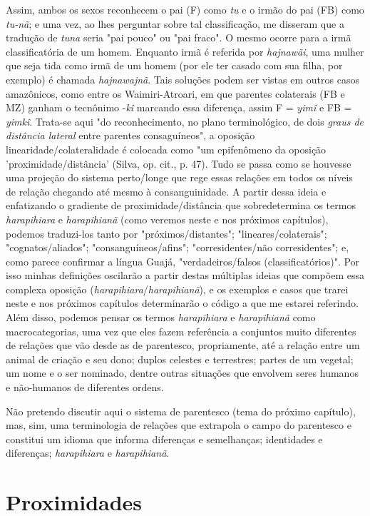 Assim, ambos os sexos reconhecem o pai (F) como \emph{tu} e o irmão do
pai (FB) como \emph{tu-nã}; e uma vez, ao lhes perguntar sobre tal
classificação, me disseram que a tradução de \emph{tuna} seria "pai
pouco" ou "pai fraco". O mesmo ocorre para a irmã classificatória de um
homem. Enquanto irmã é referida por \emph{hajnawãi}, uma mulher que seja
tida como irmã de um homem (por ele ter casado com sua filha, por
exemplo) é chamada \emph{hajnawajnã}. Tais soluções podem ser vistas em
outros casos amazônicos, como entre os Waimiri-Atroari, em que parentes
colaterais (FB e MZ) ganham o tecnônimo -\emph{kî} marcando essa
diferença, assim F = \emph{yimî} e FB = \emph{yimkî}. Trata-se aqui "do
reconhecimento, no plano terminológico, de dois \emph{graus de distância
lateral} entre parentes consaguíneos", a oposição
linearidade/colateralidade é colocada como "um epifenômeno da oposição
'proximidade/distância' (Silva, op. cit., p. 47). Tudo se passa como se
houvesse uma projeção do sistema perto/longe que rege essas relações em
todos os níveis de relação chegando até mesmo à consanguinidade. A
partir dessa ideia e enfatizando o gradiente de proximidade/distância
que sobredetermina os termos \emph{harapihiara} e \emph{harapihianã}
(como veremos neste e nos próximos capítulos), podemos traduzi-los tanto
por "próximos/distantes"; "lineares/colaterais"; "cognatos/aliados";
"consanguíneos/afins"; "corresidentes/não corresidentes"; e, como parece
confirmar a língua Guajá, "verdadeiros/falsos (classificatórios)". Por
isso minhas definições oscilarão a partir destas múltiplas ideias que
compõem essa complexa oposição (\emph{harapihiara}/\emph{harapihianã}),
e os exemplos e casos que trarei neste e nos próximos capítulos
determinarão o código a que me estarei referindo. Além disso, podemos
pensar os termos \emph{harapihiara} e \emph{harapihianã} como
macrocategorias, uma vez que eles fazem referência a conjuntos muito
diferentes de relações que vão desde as de parentesco, propriamente, até
a relação entre um animal de criação e seu dono; duplos celestes e
terrestres; partes de um vegetal; um nome e o ser nominado, dentre
outras situações que envolvem seres humanos e não-humanos de diferentes
ordens.

Não pretendo discutir aqui o sistema de parentesco (tema do próximo
capítulo), mas, sim, uma terminologia de relações que extrapola o campo
do parentesco e constitui um idioma que informa diferenças e
semelhanças; identidades e diferenças; \emph{harapihiara} e
\emph{harapihianã}.

\section{Proximidades}

